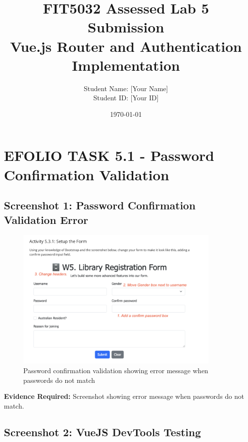 \documentclass[11pt,a4paper]{article}
\title{\textbf{FIT5032 Assessed Lab 5 Submission\\Vue.js Router and Authentication Implementation}}
\author{Student Name: [Your Name]\\Student ID: [Your ID]}
\date{\today}
\begin{document}
\maketitle

\newpage


\section{EFOLIO TASK 5.1 - Password Confirmation Validation}

\subsection{Screenshot 1: Password Confirmation Validation Error}

 \begin{figure}[h]
     \centering
     \includegraphics[width=0.9\textwidth]{password_validation_error.png}
     \caption{Password confirmation validation showing error message when passwords do not match}
     \label{fig:password_error}
\end{figure}

\textbf{Evidence Required:} Screenshot showing error message when passwords do not match.

\subsection{Screenshot 2: VueJS DevTools Testing}
\end{document}
